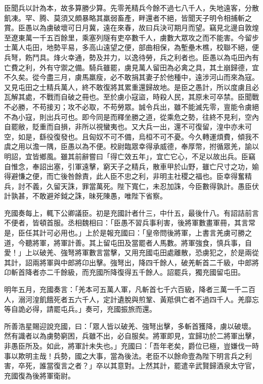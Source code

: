 \begin{pinyinscope}
臣聞兵以計為本，故多算勝少算。先零羌精兵今餘不過七八千人，失地遠客，分散飢凍。罕、腾、莫須又頗暴略其羸弱畜產，畔還者不絕，皆聞天子明令相捕斬之賞。臣愚以為虜破壞可日月冀，遠在來春，故曰兵決可期月而望。竊見北邊自敦煌至遼東萬一千五百餘里，乘塞列隧有吏卒數千人，虜數大眾攻之而不能害。今留步士萬人屯田，地勢平易，多高山遠望之便，部曲相保，為塹壘木樵，校聯不絕，便兵弩，飭鬥具。烽火幸通，勢及并力，以逸待勞，兵之利者也。臣愚以為屯田內有亡費之利，外有守禦之備。騎兵雖罷，虜見萬人留田為必禽之具，其土崩歸德，宜不久矣。從今盡三月，虜馬羸瘦，必不敢捐其妻子於他種中，遠涉河山而來為寇。又見屯田之士精兵萬人，終不敢復將其累重還歸故地。是臣之愚計，所以度虜且必瓦解其處，不戰而自破之冊也。至於虜小寇盜，時殺人民，其原未可卒禁。臣聞戰不必勝，不苟接刃；攻不必取，不苟勞眾。誠令兵出，雖不能滅先零，亶能令虜絕不為小寇，則出兵可也。即今同是而釋坐勝之道，從乘危之勢，往終不見利，空內自罷敝，貶重而自損，非所以視蠻夷也。又大兵一出，還不可復留，湟中亦未可空，如是，繇役復發也。且匈奴不可不備，烏桓不可不憂。今久轉運煩費，傾我不虞之用以澹一隅，臣愚以為不便。校尉臨眾幸得承威德，奉厚幣，拊循眾羌，諭以明詔，宜皆鄉風。雖其前辭嘗曰「得亡效五年」，宜亡它心，不足以故出兵。臣竊自惟念，奉詔出塞，引軍遠擊，窮天子之精兵，散車甲於山野，雖亡尺寸之功，媮得避慊之便，而亡後咎餘責，此人臣不忠之利，非明主社稷之福也。臣幸得奮精兵，討不義，久留天誅，罪當萬死。陛下寬仁，未忍加誅，今臣數得孰計。愚臣伏計孰甚，不敢避斧鉞之誅，昧死陳愚，唯陛下省察。

充國奏每上，輒下公卿議臣。初是充國計者什三，中什五，最後什八。有詔詰前言不便者，皆頓首服。丞相魏相曰：「臣愚不習兵事利害，後將軍數畫軍冊，其言常是，臣任其計可必用也。」上於是報充國曰：「皇帝問後將軍，上書言羌虜可勝之道，今聽將軍，將軍計善。其上留屯田及當罷者人馬數。將軍強食，慎兵事，自愛！」上以破羌、強弩將軍數言當擊，又用充國屯田處離散，恐虜犯之，於是兩從其計，詔兩將軍與中郎將卬出擊。強弩出，降四千餘人，破羌斬首二千級，中郎將卬斬首降者亦二千餘級，而充國所降復得五千餘人。詔罷兵，獨充國留屯田。

明年五月，充國奏言：「羌本可五萬人軍，凡斬首七千六百級，降者三萬一千二百人，溺河湟飢餓死者五六千人，定計遺脫與煎鞏、黃羝俱亡者不過四千人。羌靡忘等自詭必得，請罷屯兵。」奏可，充國振旅而還。

所善浩星賜迎說充國，曰：「眾人皆以破羌、強弩出擊，多斬首獲降，虜以破壞。然有識者以為虜勢窮困，兵雖不出，必自服矣。將軍即見，宜歸功於二將軍出擊，非愚臣所及。如此，將軍計未失也。」充國曰：「吾年老矣，爵位已極，豈嫌伐一時事以欺明主哉！兵勢，國之大事，當為後法。老臣不以餘命壹為陛下明言兵之利害，卒死，誰當復言之者？」卒以其意對。上然其計，罷遣辛武賢歸酒泉太守官，充國復為後將軍衛尉。


\end{pinyinscope}
